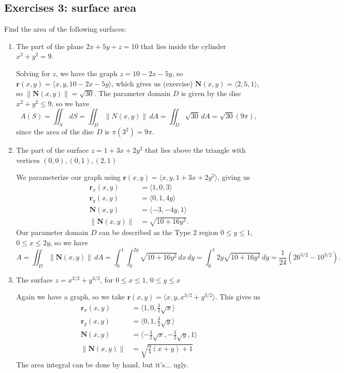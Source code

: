 \documentclass[12pt,letterpaper]{article}
\renewcommand{\r}{\mathbf{r}}
\newcommand{\N}{\mathbf{N}}
\newcommand{\len}[1]{\left\lVert #1\right\rVert}
\begin{document}
\subsection{Exercises 3: surface area}
Find the area of the following surfaces:
\begin{enumerate}
 \item The part of the plane $2x+5y+z=10$ that lies inside the cylinder $x^2+y^2=9$.

\bigskip

Solving for $z$, we have the graph $z=10-2x-5y$, so $\r(x,y) = \langle x, y, 10-2x-5y\rangle$, which gives us (exercise) $\N(x,y) = \langle 2, 5, 1\rangle$, so $\len{\N(x,y)} = \sqrt{30}$. The parameter domain $D$ is given by the disc $x^2+y^2\leq 9$, so we have
\[
 A(S) = \iint_S \,dS = \iint_D \len{N(x,y)}\,dA = \iint_D\sqrt{30}\,dA = \sqrt{30}(9\pi),
\]
since the area of the disc $D$ is $\pi(3^2)=9\pi$.

 \item The part of the surface $z=1+3x+2y^2$ that lies above the triangle with vertices $(0,0), (0,1), (2,1)$

\bigskip

We parameterize our graph using $\r(x,y) = \langle x, y, 1+3x+2y^2\rangle$, giving us
\begin{align*}
 \r_x(x,y) & = \langle 1, 0, 3\rangle\\
 \r_y(x,y) & = \langle 0, 1, 4y\rangle\\
 \N(x,y) & = \langle -3, -4y, 1\rangle\\
 \len{\N(x,y)} & = \sqrt{10+16y^2}.
\end{align*}
Our parameter domain $D$ can be described as the Type 2 region $0\leq y\leq 1$, $0\leq x\leq 2y$, so we have
\[
 A = \iint_D\len{\N(x,y)}\,dA = \int_0^1\int_0^{2y}\sqrt{10+16y^2}\,dx\,dy = \int_0^1 2y\sqrt{10+16y^2}\,dy = \frac{1}{24}(26^{3/2}-10^{3/2}).
\]

 \item The surface $z=x^{3/2}+y^{3/2}$, for $0\leq x\leq 1$, $0\leq y\leq x$

\bigskip

Again we have a graph, so we take $\r(x,y) = \langle x, y, x^{3/2}+y^{3/2}\rangle$. This gives us
\begin{align*}
 \r_x(x,y) & = \langle 1, 0, \frac{3}{2}\sqrt{x}\rangle\\
 \r_y(x,y) & = \langle 0, 1, \frac{3}{2}\sqrt{y}\rangle\\
 \N(x,y) & = \langle -\frac{3}{2}\sqrt{x}, -\frac{3}{2}\sqrt{y}, 1\rangle\\
 \len{\N(x,y)} & = \sqrt{\frac{9}{4}(x+y)+1}
\end{align*}
The area integral can be done by hand, but it's... ugly. 

\end{enumerate}
\end{document}
